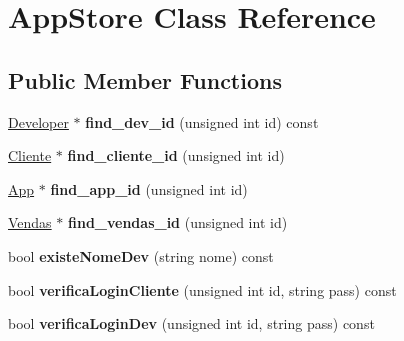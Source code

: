 \hypertarget{class_app_store}{\section{App\+Store Class Reference}
\label{class_app_store}
}
\subsection*{Public Member Functions}
\begin{DoxyCompactItemize}
\item 
\hypertarget{class_app_store_a846404e97e4d559aafdb52be79cea7c7}{\hyperlink{class_developer}{Developer} $\ast$ {\bfseries find\+\_\+dev\+\_\+id} (unsigned int id) const }\label{class_app_store_a846404e97e4d559aafdb52be79cea7c7}

\item 
\hypertarget{class_app_store_a722d56a8ed98ad6cb26521be7129d38f}{\hyperlink{class_cliente}{Cliente} $\ast$ {\bfseries find\+\_\+cliente\+\_\+id} (unsigned int id)}\label{class_app_store_a722d56a8ed98ad6cb26521be7129d38f}

\item 
\hypertarget{class_app_store_ae123ae1f957d51b7c4872fe71e23629d}{\hyperlink{class_app}{App} $\ast$ {\bfseries find\+\_\+app\+\_\+id} (unsigned int id)}\label{class_app_store_ae123ae1f957d51b7c4872fe71e23629d}

\item 
\hypertarget{class_app_store_ad27a968e34cfe98fceca2b78fe1b2b70}{\hyperlink{class_vendas}{Vendas} $\ast$ {\bfseries find\+\_\+vendas\+\_\+id} (unsigned int id)}\label{class_app_store_ad27a968e34cfe98fceca2b78fe1b2b70}

\item 
\hypertarget{class_app_store_a3332b74ff7a7afea68b2834ffe1cdd58}{bool {\bfseries existe\+Nome\+Dev} (string nome) const }\label{class_app_store_a3332b74ff7a7afea68b2834ffe1cdd58}

\item 
\hypertarget{class_app_store_a3e8ce8e16ba9ff688af3604da47aceed}{bool {\bfseries verifica\+Login\+Cliente} (unsigned int id, string pass) const }\label{class_app_store_a3e8ce8e16ba9ff688af3604da47aceed}

\item 
\hypertarget{class_app_store_aafe13636e2785b91c770cb39c590dddf}{bool {\bfseries verifica\+Login\+Dev} (unsigned int id, string pass) const }\label{class_app_store_aafe13636e2785b91c770cb39c590dddf}


\end{DoxyCompactItemize}
